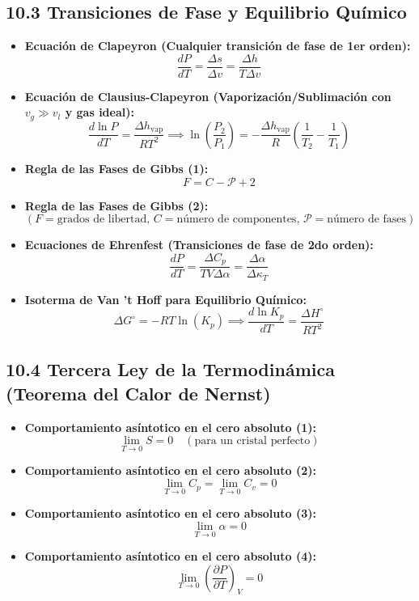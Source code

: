 \documentclass[11pt,a4paper]{article}
\begin{document}
\subsection*{10.3 Transiciones de Fase y Equilibrio Químico}

\begin{itemize}
  \item \textbf{Ecuación de Clapeyron (Cualquier transición de fase de 1er orden):}
  \[
    \frac{dP}{dT} = \frac{\Delta s}{\Delta v} = \frac{\Delta h}{T \Delta v}
  \]
  \item \textbf{Ecuación de Clausius-Clapeyron (Vaporización/Sublimación con $v_g \gg v_l$ y gas ideal):}
  \[
    \frac{d \ln P}{dT} = \frac{\Delta h_{\mathrm{vap}}}{R T^2} \implies \ln\left( \frac{P_2}{P_1} \right) = -\frac{\Delta h_{\mathrm{vap}}}{R} \left( \frac{1}{T_2} - \frac{1}{T_1} \right)
  \]
  \item \textbf{Regla de las Fases de Gibbs (1):}
  \[
    F = C - \mathcal{P} + 2
  \]
  \item \textbf{Regla de las Fases de Gibbs (2):}
  \[
    (F = \text{grados de libertad}, \, C = \text{número de componentes}, \, \mathcal{P} = \text{número de fases})
  \]
  \item \textbf{Ecuaciones de Ehrenfest (Transiciones de fase de 2do orden):}
  \[
    \frac{dP}{dT} = \frac{\Delta C_p}{T V \Delta \alpha} = \frac{\Delta \alpha}{\Delta \kappa_T}
  \]
  \item \textbf{Isoterma de Van 't Hoff para Equilibrio Químico:}
  \[
    \Delta G^\circ = -R T \ln(K_p) \implies \frac{d \ln K_p}{dT} = \frac{\Delta H^\circ}{R T^2}
  \]
\end{itemize}

\subsection*{10.4 Tercera Ley de la Termodinámica (Teorema del Calor de Nernst)}

\begin{itemize}
  \item \textbf{Comportamiento asíntotico en el cero absoluto (1):}
  \[
    \lim_{T \to 0} S = 0 \quad (\text{para un cristal perfecto})
  \]
  \item \textbf{Comportamiento asíntotico en el cero absoluto (2):}
  \[
    \lim_{T \to 0} C_p = \lim_{T \to 0} C_v = 0
  \]
  \item \textbf{Comportamiento asíntotico en el cero absoluto (3):}
  \[
    \lim_{T \to 0} \alpha = 0
  \]
  \item \textbf{Comportamiento asíntotico en el cero absoluto (4):}
  \[
    \lim_{T \to 0} \left( \frac{\partial P}{\partial T} \right)_V = 0
  \]
\end{itemize}
\end{document}
